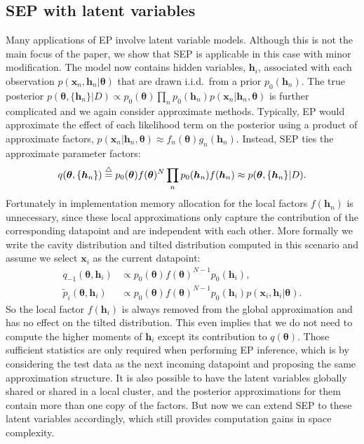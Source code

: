 
\subsection{SEP with latent variables}

Many applications of EP involve latent variable models. Although this is not the main focus of the paper, we show that SEP is applicable in this case with minor modification. The model now contains hidden variables, $\bm{h}_i$, associated with each observation $p(\bm{x}_n, \bm{h}_n | \bm{\theta})$  that are drawn i.i.d.~from a prior $p_0(\bm{h}_n)$. The true posterior $p(\bm{\theta}, \{ \bm{h}_n\} | D) \propto p_0(\bm{\theta}) \prod_n p_0(\bm{h}_n) p(\bm{x}_n | \bm{h}_n, \bm{\theta})$ is further complicated and we again consider approximate methods. 
%
Typically, EP would approximate the effect of each likelihood term on the posterior using a product of approximate factors, $p(\bm{x}_n | \bm{h}_n, \bm{\theta}) \approx f_n(\bm{\theta}) g_n(\bm{h}_n) $. Instead, SEP ties the approximate parameter factors:
\begin{equation}
q(\bm{\theta}, \{ \bm{h}_n\}) \buildrel\triangle\over = p_0(\bm{\theta}) f(\bm{\theta})^N \prod_n p_0(\bm{h}_n) f(\bm{h}_n) \approx p(\bm{\theta}, \{ \bm{h}_n\} | D).
\end{equation}
%
Fortunately in implementation memory allocation for the local factors $f(\bm{h}_n)$ is unnecessary, since these local approximations only capture the contribution of the corresponding datapoint and are independent with each other. More formally we write the cavity distribution and tilted distribution computed in this scenario and assume we select $\bm{x}_i$ as the current datapoint:
\begin{align}
q_{-1}(\bm{\theta}, \bm{h}_i) &\propto  p_0(\bm{\theta}) f(\bm{\theta})^{N-1} p_0(\bm{h}_i), \\
\tilde{p}_i(\bm{\theta}, \bm{h}_i) &\propto p_0(\bm{\theta}) f(\bm{\theta})^{N-1} p_0(\bm{h}_i) p(\bm{x}_i, \bm{h}_i | \bm{\theta}).
\end{align}
So the local factor $f(\bm{h}_i)$ is always removed from the global approximation and has no effect on the tilted distribution. This even implies that we do not need to compute the higher moments of $\bm{h}_i$ except its contribution to $q(\bm{\theta})$. Those sufficient statistics are only required when performing EP inference, which is by considering the test data as the next incoming datapoint and proposing the same approximation structure. It is also possible to have the latent variables globally shared or shared in a local cluster, and the posterior approximations for them contain more than one copy of the factors. But now we can extend SEP to these latent variables accordingly, which still provides computation gains in space complexity.

